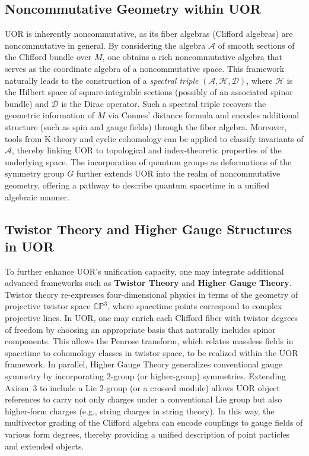 \documentclass[12pt]{article}
\begin{document}
\subsection{Noncommutative Geometry within UOR}
UOR is inherently noncommutative, as its fiber algebras (Clifford algebras) are noncommutative in general. By considering the algebra $\mathcal{A}$ of smooth sections of the Clifford bundle over $M$, one obtains a rich noncommutative algebra that serves as the coordinate algebra of a noncommutative space. This framework naturally leads to the construction of a \emph{spectral triple} $(\mathcal{A},\mathcal{H},\mathcal{D})$, where $\mathcal{H}$ is the Hilbert space of square-integrable sections (possibly of an associated spinor bundle) and $\mathcal{D}$ is the Dirac operator. Such a spectral triple recovers the geometric information of $M$ via Connes' distance formula and encodes additional structure (such as spin and gauge fields) through the fiber algebra. Moreover, tools from K-theory and cyclic cohomology can be applied to classify invariants of $\mathcal{A}$, thereby linking UOR to topological and index-theoretic properties of the underlying space. The incorporation of quantum groups as deformations of the symmetry group $G$ further extends UOR into the realm of noncommutative geometry, offering a pathway to describe quantum spacetime in a unified algebraic manner.

\subsection{Twistor Theory and Higher Gauge Structures in UOR}
To further enhance UOR’s unification capacity, one may integrate additional advanced frameworks such as \textbf{Twistor Theory} and \textbf{Higher Gauge Theory}. Twistor theory re-expresses four-dimensional physics in terms of the geometry of projective twistor space $\mathbb{CP}^3$, where spacetime points correspond to complex projective lines. In UOR, one may enrich each Clifford fiber with twistor degrees of freedom by choosing an appropriate basis that naturally includes spinor components. This allows the Penrose transform, which relates massless fields in spacetime to cohomology classes in twistor space, to be realized within the UOR framework. In parallel, Higher Gauge Theory generalizes conventional gauge symmetry by incorporating 2-group (or higher-group) symmetries. Extending Axiom~3 to include a Lie 2-group (or a crossed module) allows UOR object references to carry not only charges under a conventional Lie group but also higher-form charges (e.g., string charges in string theory). In this way, the multivector grading of the Clifford algebra can encode couplings to gauge fields of various form degrees, thereby providing a unified description of point particles and extended objects.
\end{document}
